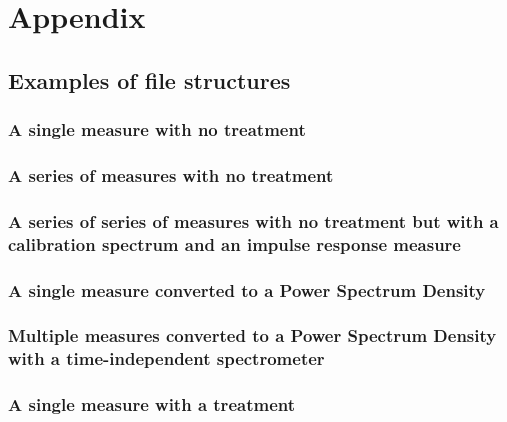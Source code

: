 \documentclass{book}
\begin{document}
\appendix

\part*{Appendix}

\chapter{Examples of file structures} \label{chap:examples_file_structures}
    \section{A single measure with no treatment}
        
    
    \section{A series of measures with no treatment}
        
    
    \section{A series of series of measures with no treatment but with a calibration spectrum and an impulse response measure}
        
    
    \section{A single measure converted to a Power Spectrum Density}
        
    
    \section{Multiple measures converted to a Power Spectrum Density with a time-independent spectrometer}
        

    \section{A single measure with a treatment}
        
    
\end{document}
